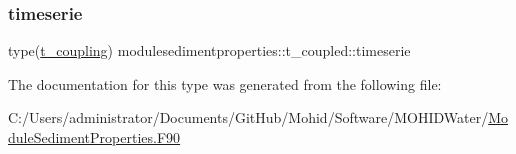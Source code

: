 \mbox{\label{structmodulesedimentproperties_1_1t__coupled_a0d8db175f8e53e807f9be8c57230e7ad}} 
\subsubsection{\texorpdfstring{timeserie}{timeserie}}
{\footnotesize\ttfamily type(\mbox{\hyperlink{structmodulesedimentproperties_1_1t__coupling}{t\+\_\+coupling}}) modulesedimentproperties\+::t\+\_\+coupled\+::timeserie\hspace{0.3cm}{\ttfamily [private]}}



The documentation for this type was generated from the following file\+:\begin{DoxyCompactItemize}
\item 
C\+:/\+Users/administrator/\+Documents/\+Git\+Hub/\+Mohid/\+Software/\+M\+O\+H\+I\+D\+Water/\mbox{\hyperlink{_module_sediment_properties_8_f90}{Module\+Sediment\+Properties.\+F90}}\end{DoxyCompactItemize}
